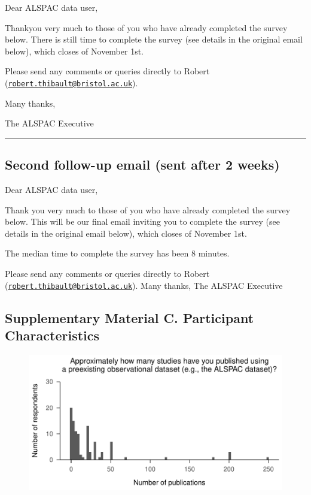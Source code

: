 \documentclass[
  man,floatsintext]{apa6}
\begin{document}
Dear ALSPAC data user,

Thankyou very much to those of you who have already completed the survey below.
There is still time to complete the survey (see details in the original email below), which closes of November 1st.

Please send any comments or queries directly to Robert (\href{mailto:robert.thibault@bristol.ac.uk}{\nolinkurl{robert.thibault@bristol.ac.uk}}).

Many thanks,

The ALSPAC Executive

\begin{center}\rule{0.5\linewidth}{0.5pt}\end{center}

\hypertarget{second-follow-up-email-sent-after-2-weeks}{%
\subsection{Second follow-up email (sent after 2 weeks)}\label{second-follow-up-email-sent-after-2-weeks}}

Dear ALSPAC data user,

Thank you very much to those of you who have already completed the survey below.
This will be our final email inviting you to complete the survey (see details in the original email below), which closes of November 1st.

The median time to complete the survey has been 8 minutes.

Please send any comments or queries directly to Robert (\href{mailto:robert.thibault@bristol.ac.uk}{\nolinkurl{robert.thibault@bristol.ac.uk}}).
Many thanks,
The ALSPAC Executive

\pagebreak

\hypertarget{supplementary-material-c.-participant-characteristics}{%
\subsection{Supplementary Material C. Participant Characteristics}\label{supplementary-material-c.-participant-characteristics}}

\begin{figure}

{\centering \includegraphics[width=1\linewidth]{figs/numStudiesPlot-1} 

}

\caption{ }\label{fig:numStudiesPlot}
\end{figure}
\end{document}
